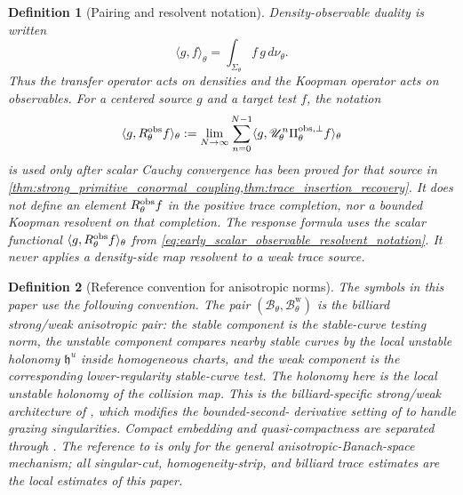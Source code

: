 \documentclass[11pt]{amsart}
\theoremstyle{compactplain}
\theoremstyle{compactdefinition}
\newtheorem*{definition*}{Definition}
\theoremstyle{compactremark}
\newcommand{\Bcal}{\mathcal B}
\newcommand{\Bweak}{\mathcal B^{\mathrm w}}
\newcommand{\Piobsperp}{\Pi^{\mathrm{obs},\perp}}
\begin{document}
\begin{definition*}[Pairing and resolvent notation]
Density-observable duality is written
\[
  \langle g,f\rangle_\theta=\int_{\Sigma_\theta} f\,g\,d\nu_\theta .
\]
Thus the transfer operator acts on densities and the Koopman operator acts on
observables.  For a centered source \(g\) and a target test \(f\), the notation
\begin{equation}
\label{eq:early_scalar_observable_resolvent_notation}
  \langle g,R_\theta^{\rm obs}f\rangle_\theta
  :=\lim_{N\to\infty}\sum_{n=0}^{N-1}
    \langle g,\mathscr U_\theta^n\Piobsperp_\theta f\rangle_\theta
\end{equation}
is used only after scalar Cauchy convergence has been proved for that source in
\cref{thm:strong_primitive_conormal_coupling,thm:trace_insertion_recovery}.
It does not define an element \(R_\theta^{\rm obs}f\) in the positive trace
completion, nor a bounded Koopman resolvent on that completion.
The response formula uses the scalar functional
\(\langle g,R_\theta^{\rm obs}f\rangle_\theta\) from
\eqref{eq:early_scalar_observable_resolvent_notation}.  It never applies a
density-side map resolvent to a weak trace source.
\end{definition*}

\begin{definition*}[Reference convention for anisotropic norms]
The symbols in this paper use the following convention.  The pair
\((\Bcal_\theta,\Bweak_\theta)\) is the billiard strong/weak anisotropic pair:
the stable component is the stable-curve testing norm, the unstable component
compares nearby stable curves by the local unstable holonomy
\(\mathfrak h^u\) inside homogeneous charts, and the weak component is the
corresponding lower-regularity stable-curve test.  The holonomy here is the
local unstable holonomy of the collision map.
This is the billiard-specific strong/weak architecture of
\cite{DemersZhang2011,DemersZhang2013}, which modifies the bounded-second-
derivative setting of \cite{DemersLiverani2008} to handle grazing
singularities.  Compact embedding and quasi-compactness are separated through
\cite{Hennion1993,Baladi2000}.  The reference to
\cite{GouezelLiverani2006} is only for the general anisotropic-Banach-space
mechanism; all singular-cut, homogeneity-strip, and billiard trace estimates
are the local estimates of this paper.
\end{definition*}
\end{document}
